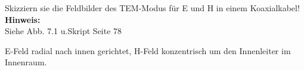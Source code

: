 \begin{question}[section=7,name={Feldbild},difficulty=,quantity=5,type=thr,tags={}]
	Skizziern sie die Feldbilder des TEM-Modus für E und H in einem Koaxialkabel!
	\\ \textbf{Hinweis:}\\
	Siehe Abb. 7.1 u.Skript Seite 78
\end{question}
\begin{solution}
	E-Feld radial nach innen gerichtet, H-Feld konzentrisch um den Innenleiter im Innenraum.
\end{solution}